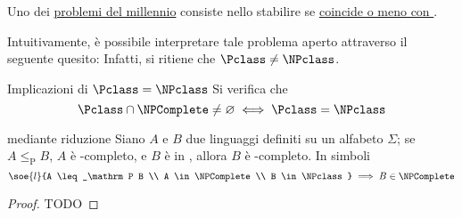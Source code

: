 \documentclass[a4paper, 12pt]{report}
\begin{document}
    \begin{framedobs}{}
        Uno dei \href{https://en.wikipedia.org/wiki/Millennium_Prize_Problems#P_versus_NP}{problemi del millennio} consiste nello stabilire se \href{https://en.wikipedia.org/wiki/P_versus_NP_problem}{\Pclass coincide o meno con \NPclass}.
        
        Intuitivamente, è possibile interpretare tale problema aperto attraverso il seguente quesito:  Infatti, si ritiene che $\Pclass \neq \NPclass$.
    \end{framedobs}

    \begin{framedprop}[label={p = np impl 3}]{Implicazioni di $\Pclass = \NPclass$}
        Si verifica che $$\Pclass \cap \NPComplete \neq \varnothing \iff \Pclass = \NPclass$$
    \end{framedprop}


    \begin{framedthm}[label={np-complete w red}]{\NPComplete mediante riduzione}
        Siano $A$ e $B$ due linguaggi definiti su un alfabeto $\Sigma$; se $A \leq_\mathrm P B$, $A$ è \NPclass-completo, e $B$ è in \NPclass, allora $B$ è \NPclass-completo. In simboli $$\soe{l}{A \leq_\mathrm P B \\ A \in \NPComplete \\ B \in \NPclass} \implies B \in \NPComplete$$
    \end{framedthm}

    \begin{proof}
        TODO
    \end{proof}
\end{document}
